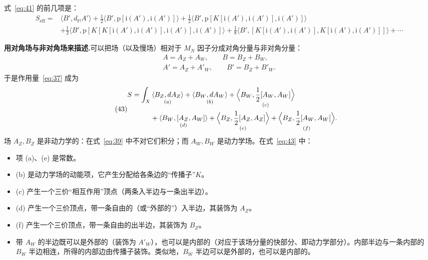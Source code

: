 式~\eqref{eq:41} 的前几项是：
\begin{equation}\tag{42}\label{eq:42}
\begin{split}
S_{\mathrm{eff}}={}&
\langle B',d_{\mathbb{M}}A'\rangle
+\frac12\langle B',\mathrm{p}[\mathrm{i}(A'),\mathrm{i}(A')]\rangle
+\frac12\langle B',\mathrm{p}[K[\mathrm{i}(A'),\mathrm{i}(A')],\mathrm{i}(A')]\rangle\\
&+\frac12\langle B',\mathrm{p}[K[K[\mathrm{i}(A'),\mathrm{i}(A')],\mathrm{i}(A')],\mathrm{i}(A')]\rangle
+\frac18\langle B',[K[\mathrm{i}(A'),\mathrm{i}(A')],K[\mathrm{i}(A'),\mathrm{i}(A')]]\rangle+\cdots
\end{split}
\end{equation}


\textbf{用对角场与非对角场来描述.}\quad 可以把场（以及慢场）相对于 $M_N$ 因子分成对角分量与非对角分量：
\[
\begin{gathered}
A=A_Z+A_W,\qquad B=B_Z+B_W,\\
A'=A_Z+A'_W,\qquad B'=B_Z+B'_W.
\end{gathered}
\]
于是作用量~\eqref{eq:37} 成为
\begin{equation}\tag{43}\label{eq:43}
\begin{split}
S=\int_X&\,\underset{(a)}{\langle B_Z,dA_Z\rangle}
+\underset{(b)}{\langle B_W,dA_W\rangle}
+\underset{(c)}{\Bigl\langle B_W,\frac12[A_W,A_W]\Bigr\rangle}\\
&+\underset{(d)}{\langle B_W,[A_Z,A_W]\rangle}
+\underset{(e)}{\Bigl\langle B_Z,\frac12[A_Z,A_Z]\Bigr\rangle}
+\underset{(f)}{\Bigl\langle B_Z,\frac12[A_W,A_W]\Bigr\rangle}.
\end{split}
\end{equation}
场 $A_Z,B_Z$ 是非动力学的：在式~\eqref{eq:39} 中不对它们积分；而 $A_W,B_W$ 是动力学场。在式~\eqref{eq:43} 中：
\begin{itemize}
  \item 项 (a)、(e) 是常数。
  \item (b) 是动力学场的动能项，它产生分配给各条边的“传播子”$K$。
  \item (c) 产生一个三价“相互作用”顶点（两条入半边与一条出半边）。
  \item (d) 产生一个三价顶点，带一条自由的（或“外部的”）入半边，其装饰为 $A_Z$。
  \item (f) 产生一个三价顶点，带一条自由的出半边，其装饰为 $B_Z$。
  \item 带 $A_W$ 的半边既可以是外部的（装饰为 $A'_W$），也可以是内部的（对应于该场分量的快部分、即动力学部分）。内部半边与一条内部的 $B_W$ 半边相连，所得的内部边由传播子装饰。类似地，$B_W$ 半边可以是外部的，也可以是内部的。
\end{itemize}

